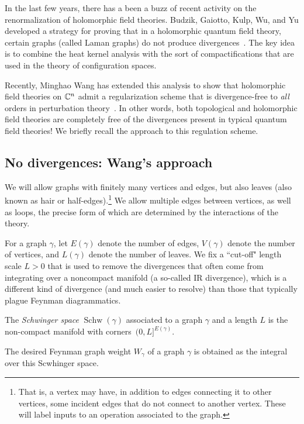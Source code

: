 \documentclass[11pt]{amsart}
\renewcommand{\op}{\operatorname}
\begin{document}
In the last few years,
there has a been a buzz of recent activity on the renormalization of holomorphic field theories.
Budzik, Gaiotto, Kulp, Wu, and Yu developed a strategy for proving that in a holomorphic quantum field theory,
certain graphs (called Laman graphs) do not produce divergences~\cite{BGKWY}.
The key idea is to combine the heat kernel analysis with the sort of compactifications that are used in the theory of configuration spaces.

Recently, Minghao Wang has extended this analysis to show that holomorphic field theories on ${\mathbb{C}}^n$ admit a regularization scheme that is divergence-free to \textit{all} orders in perturbation theory~\cite{Wang}.
In other words, both topological and holomorphic field theories are completely free of the divergences present in typical quantum field theories!
We briefly recall the approach to this regulation scheme.

\subsection{No divergences: Wang's approach}

We will allow graphs with finitely many vertices and edges, 
but also leaves (also known as hair or half-edges).\footnote{That is, a vertex may have, in addition to edges connecting it to other vertices, some incident edges that do not connect to another vertex. 
These will label inputs to an operation associated to the graph.}
We allow multiple edges between vertices, as well as loops, the precise form of which are determined by the interactions of the theory.

For a graph $\gamma$, let $E(\gamma)$ denote the number of edges,
$V(\gamma)$ denote the number of vertices,
and $L(\gamma)$ denote the number of leaves.
We fix a ``cut-off" length scale $L > 0$ that is used to remove the divergences that often come from integrating over a noncompact manifold (a so-called IR divergence), 
which is a different kind of divergence (and much easier to resolve) than those that typically plague Feynman diagrammatics.

\begin{dfn}
The {\em Schwinger space} $\op{Schw}(\gamma)$ associated to a graph $\gamma$ and a length $L$ is the non-compact manifold with corners~$(0,L]^{E(\gamma)}$.
\end{dfn}

The desired Feynman graph weight $W_\gamma$ of a graph $\gamma$ is obtained as the integral over this Scwhinger space. 
\end{document}
